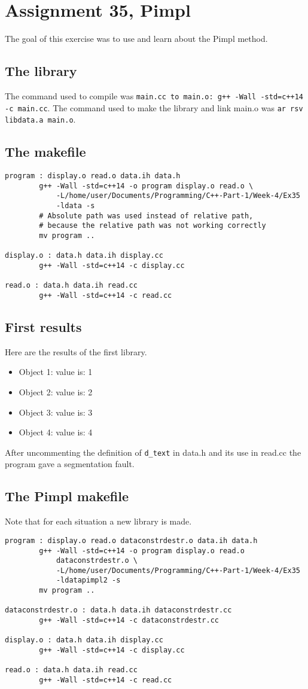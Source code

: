 \documentclass[11pt]{article}
\begin{document}
\section*{Assignment 35, Pimpl}
The goal of this exercise was to use and learn about the Pimpl method.

\subsection*{The library}
The command used to compile was \texttt{main.cc to main.o: g++ -Wall -std=c++14 -c main.cc}.
The command used to make the library and link main.o was \texttt{ar rsv libdata.a main.o}.

\subsection*{The makefile}
\begin{lstlisting}
program : display.o read.o data.ih data.h
		g++ -Wall -std=c++14 -o program display.o read.o \
			-L/home/user/Documents/Programming/C++-Part-1/Week-4/Ex35
			-ldata -s
		# Absolute path was used instead of relative path,
		# because the relative path was not working correctly
		mv program ..

display.o : data.h data.ih display.cc
		g++ -Wall -std=c++14 -c display.cc

read.o : data.h data.ih read.cc
		g++ -Wall -std=c++14 -c read.cc
\end{lstlisting}

\subsection*{First results}
Here are the results of the first library.
\begin{itemize}
\item Object 1: value is: 1
\item Object 2: value is: 2
\item Object 3: value is: 3
\item Object 4: value is: 4
\end{itemize}

After uncommenting the definition of \texttt{d\_text} in data.h and its use in read.cc the program gave a segmentation fault.

\subsection*{The Pimpl makefile}
Note that for each situation a new library is made.
\begin{lstlisting}
program : display.o read.o dataconstrdestr.o data.ih data.h
		g++ -Wall -std=c++14 -o program display.o read.o
			dataconstrdestr.o \
			-L/home/user/Documents/Programming/C++-Part-1/Week-4/Ex35
			-ldatapimpl2 -s
		mv program ..

dataconstrdestr.o : data.h data.ih dataconstrdestr.cc
		g++ -Wall -std=c++14 -c dataconstrdestr.cc

display.o : data.h data.ih display.cc
		g++ -Wall -std=c++14 -c display.cc

read.o : data.h data.ih read.cc
		g++ -Wall -std=c++14 -c read.cc
\end{lstlisting}
\end{document}
